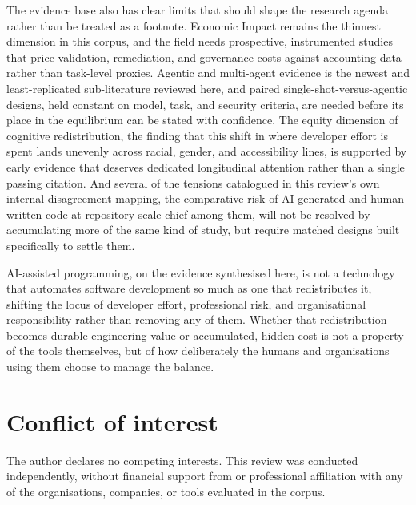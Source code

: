 The evidence base also has clear limits that should shape the research agenda rather than be treated as a footnote. Economic Impact remains the thinnest dimension in this corpus, and the field needs prospective, instrumented studies that price validation, remediation, and governance costs against accounting data rather than task-level proxies. Agentic and multi-agent evidence is the newest and least-replicated sub-literature reviewed here, and paired single-shot-versus-agentic designs, held constant on model, task, and security criteria, are needed before its place in the equilibrium can be stated with confidence. The equity dimension of cognitive redistribution, the finding that this shift in where developer effort is spent lands unevenly across racial, gender, and accessibility lines, is supported by early evidence that deserves dedicated longitudinal attention rather than a single passing citation. And several of the tensions catalogued in this review's own internal disagreement mapping, the comparative risk of AI-generated and human-written code at repository scale chief among them, will not be resolved by accumulating more of the same kind of study, but require matched designs built specifically to settle them.

AI-assisted programming, on the evidence synthesised here, is not a technology that automates software development so much as one that redistributes it, shifting the locus of developer effort, professional risk, and organisational responsibility rather than removing any of them. Whether that redistribution becomes durable engineering value or accumulated, hidden cost is not a property of the tools themselves, but of how deliberately the humans and organisations using them choose to manage the balance.



%
\section*{Conflict of interest}

The author declares no competing interests. This review was conducted independently, without financial support from or professional affiliation with any of the organisations, companies, or tools evaluated in the corpus.




